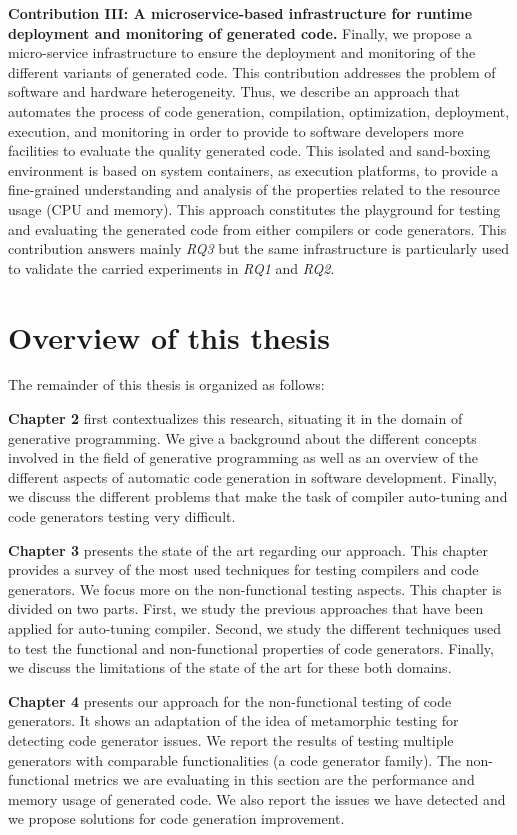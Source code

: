 \textbf{Contribution III: A microservice-based infrastructure for runtime deployment and monitoring of generated code.}
Finally, we propose a micro-service infrastructure to ensure the deployment and monitoring of the different variants of generated code. This contribution addresses the problem of software and hardware heterogeneity. Thus, we describe an approach that automates the process of code generation, compilation, optimization, deployment, execution, and monitoring in order to provide to software developers more facilities to evaluate the quality generated code. 
This isolated and sand-boxing environment is based on system containers, as execution platforms, to provide a fine-grained understanding and analysis of the properties related to the resource usage (CPU and memory). 
This approach constitutes the playground for testing and evaluating the generated code from either compilers or code generators. This contribution answers mainly \textit{RQ3} but the same infrastructure is particularly used to validate the carried experiments in \textit{RQ1} and \textit{RQ2}.

\section{Overview of this thesis}
The remainder of this thesis is organized  as follows:

\textbf{Chapter 2} first contextualizes this research, situating it in the domain of generative programming. We give a background about the different concepts involved in the field of generative programming as well as an overview of the different aspects of automatic code generation in software development. Finally, we discuss the different problems that make the task of compiler auto-tuning and code generators testing very difficult.

\textbf{Chapter 3} presents the state of the art regarding our approach. This chapter provides a survey of the most used techniques for testing compilers and code generators. We focus more on the non-functional testing aspects.
This chapter is divided on two parts. First, we study the previous approaches that have been applied for auto-tuning compiler. Second, we study the different techniques used to test the functional and non-functional properties of code generators. Finally, we discuss the limitations of the state of the art for these both domains.

\textbf{Chapter 4} presents our approach for the non-functional testing of code generators. It shows an adaptation of the idea of metamorphic testing for detecting code generator issues. We report the results of testing multiple generators with comparable functionalities (a code generator family). The non-functional metrics we are evaluating in this section are the performance and memory usage of generated code. We also report the issues we have detected and we propose solutions for code generation improvement.

